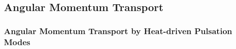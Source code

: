 
\subsection{Angular Momentum Transport}


{\color{brown}
\subsubsection{Angular Momentum Transport by Heat-driven Pulsation Modes}





}


